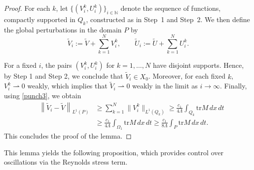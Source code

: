 \documentclass[12pt,reqno]{amsart}
\theoremstyle{definition}
\theoremstyle{remark}
\numberwithin{equation}{section}
\newcommand{\trace}{\mathrm{tr}}
\begin{document}
\begin{proof}
For each $k$, let $\{(V_i^k, U_i^k)\}_{i \in \mathbb{N}}$ denote the sequence of functions, compactly supported in $Q_k$, constructed as in Step~1 and Step~2. We then define the global perturbations in the domain $P$ by
\[
 \widetilde{V}_i :=  \widetilde{V} + \sum_{k=1}^N V_i^k, \qquad  \widetilde{U}_i :=  \widetilde{U} + \sum_{k=1}^N U_i^k.
\]

For a fixed $ i $, the pairs $ (V_i^k, U_i^k) $ for $ k = 1, \dots, N $ have disjoint supports. Hence, by Step 1 and Step 2, we conclude that $ \widetilde{V}_i \in X_0 $. Moreover, for each fixed $ k $, $ V_i^k \rightharpoonup 0 $ weakly, which implies that $ \widetilde{V}_i \rightharpoonup 0 $ weakly in the limit as $ i \to \infty $. Finally, using 
\eqref{punch3}, we obtain
\begin{equation*}
\begin{split}
 \quad \left\| \widetilde{V}_i - \widetilde{V} \right\|_{L^1(P)}& \geq \sum_{k=1}^N \|V_i^k\|_{L^1(Q_k)} \geq \frac{c_1}{4\Lambda} \int_{Q_k} \trace  M \, dx \, dt 
\\&\geq \frac{c_1}{4\Lambda} \int_{\Omega_1} \trace  M \, dx \, dt \geq \frac{c_1}{8\Lambda} \int_P \trace  M \, dx \, dt.
\end{split}
\end{equation*}
This concludes the proof of the lemma.
\end{proof}

This lemma yields the following proposition, which provides control over oscillations via the Reynolds stress term.
\end{document}
